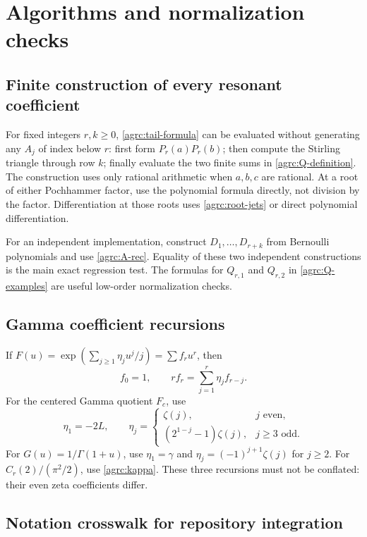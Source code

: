\appendix
\section{Algorithms and normalization checks}
\label{agrc:algorithms}

\subsection{Finite construction of every resonant coefficient}

For fixed integers $r,k\geq0$, \eqref{agrc:tail-formula} can be evaluated
without generating any $A_j$ of index below $r$:
first form $P_r(a)P_r(b)$; then compute the Stirling triangle through row
$k$; finally evaluate the two finite sums in \eqref{agrc:Q-definition}.
The construction uses only rational arithmetic when $a,b,c$ are rational.
At a root of either Pochhammer factor, use the polynomial formula
 directly, not division by the factor. Differentiation at those roots
uses \eqref{agrc:root-jets} or direct polynomial differentiation.

For an independent implementation, construct $D_1,\ldots,D_{r+k}$ from
Bernoulli polynomials and use \eqref{agrc:A-rec}. Equality of these two
independent constructions is the main exact regression test.
The formulas for $Q_{r,1}$ and $Q_{r,2}$ in
\eqref{agrc:Q-examples} are useful low-order normalization checks.

\subsection{Gamma coefficient recursions}

If $F(u)=\exp(\sum_{j\geq1}\eta_j u^j/j)=\sum f_ru^r$, then
\begin{equation}\label{agrc:general-coeff-rec}
 f_0=1,\qquad rf_r=\sum_{j=1}^r\eta_j f_{r-j}.
\end{equation}
For the centered Gamma quotient $F_c$, use
\[
 \eta_1=-2L,\qquad
 \eta_j=\begin{cases}
 \zeta(j),&j\text{ even},\\
 (2^{1-j}-1)\zeta(j),&j\geq3\text{ odd}.
 \end{cases}
\]
For $G(u)=1/\Gamma(1+u)$, use
$\eta_1=\gamma$ and $\eta_j=(-1)^{j+1}\zeta(j)$ for $j\geq2$.
For $C_r(2)/(\pi^2/2)$, use \eqref{agrc:kappa}.
These three recursions must not be conflated: their even zeta
coefficients differ.

\subsection{Notation crosswalk for repository integration}

